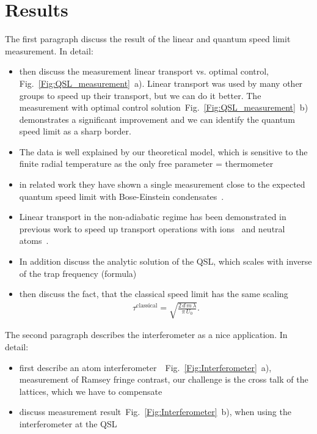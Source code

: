 \documentclass[aps,pra,reprint,a4paper,nofootinbib,superscriptaddress,numbers,longbibliography,showpacs,showkeys,floatfix]{revtex4-1}
\begin{document}
%
%

\section*{Results}

The first paragraph discuss the result of the linear and quantum speed limit measurement. In detail:
\begin{itemize}
    \item then discuss the measurement linear transport vs. optimal control, Fig.~\ref{Fig:QSL_measurement}~a). Linear transport was used by many other groups to speed up their transport, but we can do it better. The measurement with optimal control solution~Fig.~\ref{Fig:QSL_measurement}~b) demonstrates a significant improvement and we can identify the quantum speed limit as a sharp border. 
    \item The data is well explained by our theoretical model, which is sensitive to the finite radial temperature as the only free parameter = thermometer
    \item in related work they have shown a single measurement close to the expected quantum speed limit with Bose-Einstein condensates~\cite{Frank:2016, Bason:2012}. 
    \item Linear transport in the non-adiabatic regime has been demonstrated in previous work to speed up transport operations with ions~\cite{Walther:2012, Bowler:2012, Kaufmann:2017a} and neutral atoms~\cite{Couvert:2008, Chen:2010d}.
    \item In addition discuss the analytic solution of the QSL, which scales with inverse of the trap frequency (formula)
    \item then discuss the fact, that the classical speed limit has the same scaling
        \begin{equation}
        \begin{aligned}
        \tau^{\text{classical}} = \sqrt{\frac{2 \, d \, m \, \lambda}{\pi \, U_0}}.
        \end{aligned}      
        \end{equation}
\end{itemize}

The second paragraph describes the interferometer as a nice application. In detail:
\begin{itemize}
    \item first describe an atom interferometer~\cite{Steffen:2012}~Fig.~\ref{Fig:Interferometer}~a), measurement of Ramsey fringe contrast, our challenge is the cross talk of the lattices, which we have to compensate
    \item discuss measurement result~Fig.~\ref{Fig:Interferometer}~b), when using the interferometer at the QSL
\end{itemize}
\end{document}
